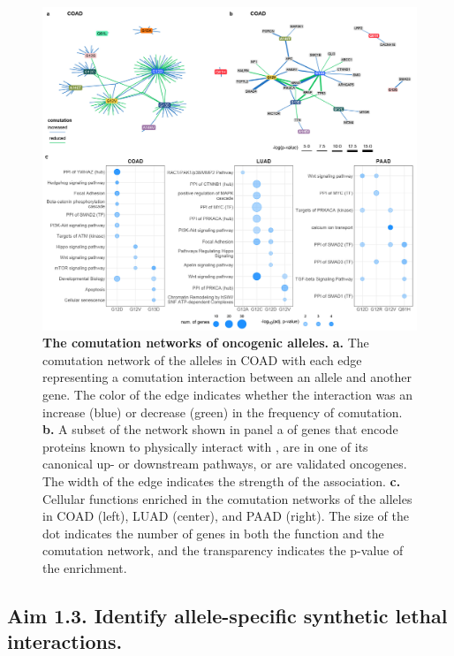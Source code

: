 \begin{figure}[htbp]
\centering
\includegraphics[width=180mm]{figures/aim1/Fig_3_mod_abc.jpg}
\caption{
    \textbf{The comutation networks of oncogenic \KRAS{} alleles.}
    \textbf{a.} The comutation network of the \KRAS{} alleles in COAD with each edge representing a comutation interaction between an allele and another gene. The color of the edge indicates whether the interaction was an increase (blue) or decrease (green) in the frequency of comutation.
    \textbf{b.} A subset of the network shown in panel a of genes that encode proteins known to physically interact with \kras{}, are in one of its canonical up- or downstream pathways, or are validated oncogenes. The width of the edge indicates the strength of the association.
    \textbf{c.} Cellular functions enriched in the comutation networks of the \KRAS{} alleles in COAD (left), LUAD (center), and PAAD (right). The size of the dot indicates the number of genes in both the function and the comutation network, and the transparency indicates the p-value of the enrichment.
}
\label{fig:comutation-networks}
\end{figure}



\subsection*{Aim 1.3. Identify \KRAS{} allele-specific synthetic lethal interactions.}

